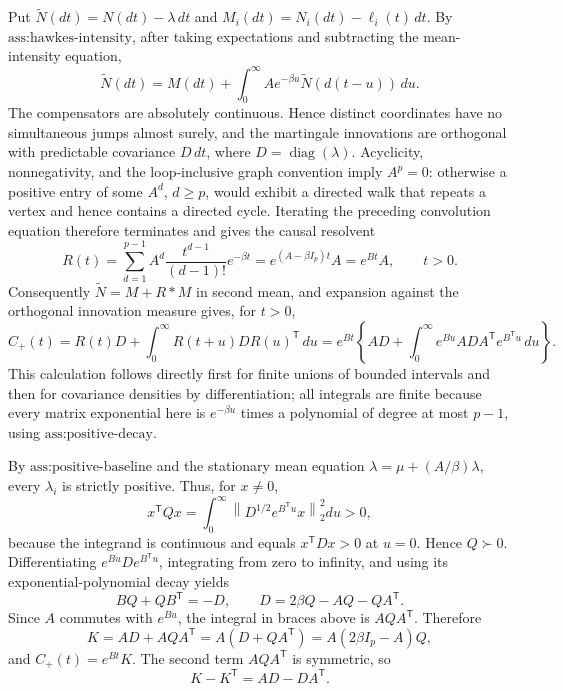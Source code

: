 Put \(\widetilde N(dt)=N(dt)-\lambda\,dt\) and \(M_i(dt)=N_i(dt)-\ell_i(t)\,dt\).  By \(\text{ass:hawkes-intensity}\), after taking expectations and subtracting the mean-intensity equation,
\[
 \widetilde N(dt)=M(dt)+\int_0^\infty Ae^{-\beta u}\widetilde N(d(t-u))\,du .
\]
The compensators are absolutely continuous.  Hence distinct coordinates have no simultaneous jumps almost surely, and the martingale innovations are orthogonal with predictable covariance \(D\,dt\), where \(D=\operatorname{diag}(\lambda)\).  Acyclicity, nonnegativity, and the loop-inclusive graph convention imply \(A^p=0\): otherwise a positive entry of some \(A^d\), \(d\geq p\), would exhibit a directed walk that repeats a vertex and hence contains a directed cycle.  Iterating the preceding convolution equation therefore terminates and gives the causal resolvent
\[
 R(t)=\sum_{d=1}^{p-1}A^d\frac{t^{d-1}}{(d-1)!}e^{-\beta t}=e^{(A-\beta I_p)t}A=e^{Bt}A,\qquad t>0.
\]
Consequently \(\widetilde N=M+R*M\) in second mean, and expansion against the orthogonal innovation measure gives, for \(t>0\),
\[
 C_+(t)=R(t)D+\int_0^\infty R(t+u)DR(u)^{\mathsf T}\,du
 =e^{Bt}\left\{AD+\int_0^\infty e^{Bu}ADA^{\mathsf T}e^{B^{\mathsf T}u}\,du\right\}.
\]
This calculation follows directly first for finite unions of bounded intervals and then for covariance densities by differentiation; all integrals are finite because every matrix exponential here is \(e^{-\beta u}\) times a polynomial of degree at most \(p-1\), using \(\text{ass:positive-decay}\).

By \(\text{ass:positive-baseline}\) and the stationary mean equation \(\lambda=\mu+(A/\beta)\lambda\), every \(\lambda_i\) is strictly positive.  Thus, for \(x\neq0\),
\[
 x^{\mathsf T}Qx=\int_0^\infty\left\|D^{1/2}e^{B^{\mathsf T}u}x\right\|_2^2du>0,
\]
because the integrand is continuous and equals \(x^{\mathsf T}Dx>0\) at \(u=0\).  Hence \(Q\succ0\).  Differentiating \(e^{Bu}De^{B^{\mathsf T}u}\), integrating from zero to infinity, and using its exponential-polynomial decay yields
\[
 BQ+QB^{\mathsf T}=-D,\qquad D=2\beta Q-AQ-QA^{\mathsf T}.
\]
Since \(A\) commutes with \(e^{Bu}\), the integral in braces above is \(AQA^{\mathsf T}\).  Therefore
\[
 K=AD+AQA^{\mathsf T}=A(D+QA^{\mathsf T})=A(2\beta I_p-A)Q,
\]
and \(C_+(t)=e^{Bt}K\).  The second term \(AQA^{\mathsf T}\) is symmetric, so
\[
 K-K^{\mathsf T}=AD-DA^{\mathsf T}.
\]

